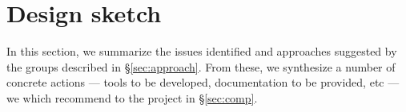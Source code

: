 \section{Design sketch}
\label{sec:design}

In this section, we summarize the issues identified and approaches suggested
by the groups described in \S\ref{sec:approach}. From these, we synthesize a
number of concrete actions --- tools to be developed, documentation to be
provided, etc --- we which recommend to the project in \S\ref{sec:comp}.




